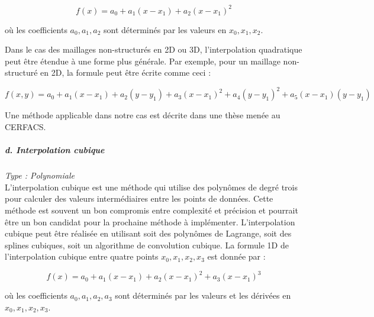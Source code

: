 \begin{equation}
    f(x) = a_0 + a_1(x - x_1) + a_2(x - x_1)^2
\end{equation}

où les coefficients \( a_0, a_1, a_2 \) sont déterminés par les valeurs en \( x_0, x_1, x_2 \).

Dans le cas des maillages non-structurés en 2D ou 3D, l'interpolation quadratique peut être étendue à une forme plus générale. Par exemple, pour un maillage non-structuré en 2D, la formule peut être écrite comme ceci :

\vspace{-0,5 cm}

\begin{equation}
    f(x, y) = a_0 + a_1(x - x_1) + a_2(y - y_1) + a_3(x - x_1)^2 + a_4(y - y_1)^2 + a_5(x - x_1)(y - y_1)
\end{equation}

Une méthode applicable dans notre cas est décrite dans une thèse menée au CERFACS\cite{alexis}.


\subparagraph{d. Interpolation cubique \cite{tanaka}}
\textit{Type : Polynomiale} \\
\phantom{----}L'interpolation cubique est une méthode qui utilise des polynômes de degré trois pour calculer des valeurs intermédiaires entre les points de données. Cette méthode est souvent un bon compromis entre complexité et précision et pourrait être un bon candidat pour la prochaine méthode à implémenter. L'interpolation cubique peut être réalisée en utilisant soit des polynômes de Lagrange, soit des splines cubiques, soit un algorithme de convolution cubique.
La formule 1D de l'interpolation cubique entre quatre points \( x_0, x_1, x_2, x_3 \) est donnée par :

\vspace{-0,5 cm}

\begin{equation}
    f(x) = a_0 + a_1(x - x_1) + a_2(x - x_1)^2 + a_3(x - x_1)^3
\end{equation}

où les coefficients \( a_0, a_1, a_2, a_3 \) sont déterminés par les valeurs et les dérivées en \( x_0, x_1, x_2, x_3 \).


